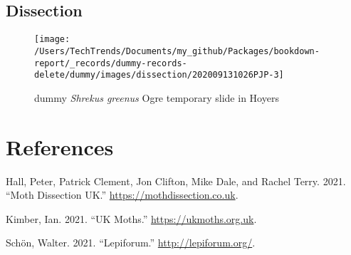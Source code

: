 \documentclass{article}
\newlength{\cslhangindent}
\newlength{\cslentryspacingunit} %
\newenvironment{CSLReferences}[2] %
 {%
  \setlength{\parindent}{0pt}
  \ifodd #1
  \let\oldpar\par
  \def\par{\hangindent=\cslhangindent\oldpar}
  \fi
  \setlength{\parskip}{#2\cslentryspacingunit}
 }%
 {}
\begin{document}
\hypertarget{dissection}{%
\subsection{Dissection}\label{dissection}}

\begin{figure}[p]

{\centering \texttt{[image: /Users/TechTrends/Documents/my\_github/Packages/bookdown-report/\_records/dummy-records-delete/dummy/images/dissection/202009131026PJP-3]} 

}

\caption{dummy  \emph{ Shrekus greenus } Ogre temporary slide in Hoyers}\label{fig:unnamed-chunk-17}
\end{figure}

\hypertarget{references}{%
\section*{References}\label{references}}

\hypertarget{refs}{}
\begin{CSLReferences}{1}{0}
\leavevmode{}%
Hall, Peter, Patrick Clement, Jon Clifton, Mike Dale, and Rachel Terry. 2021. {``{Moth Dissection UK}.''} \url{https://mothdissection.co.uk}.

\leavevmode{}%
Kimber, Ian. 2021. {``{UK Moths}.''} \url{https://ukmoths.org.uk}.

\leavevmode{}%
Schön, Walter. 2021. {``{Lepiforum}.''} \url{http://lepiforum.org/}.

\end{CSLReferences}

\let\cleardoublepage\clearpage



\end{document}
